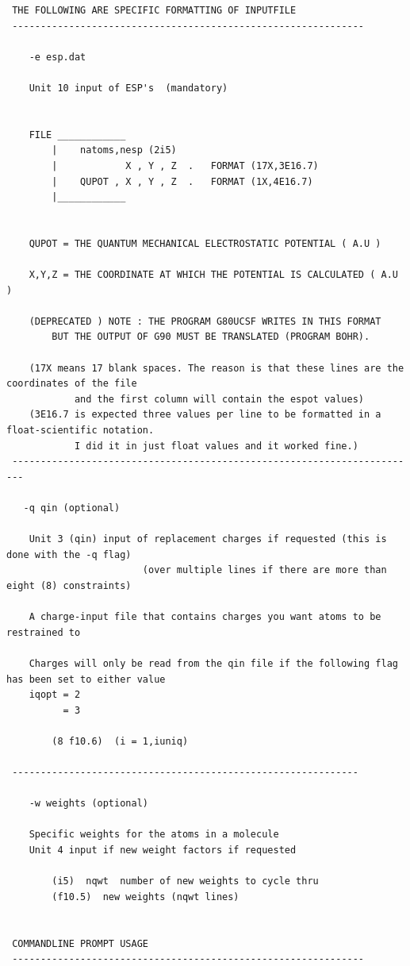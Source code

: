 \documentclass[a4paper]{article}
\begin{document}
\begin{tcolorbox}
\begin{verbatim}
 THE FOLLOWING ARE SPECIFIC FORMATTING OF INPUTFILE
 --------------------------------------------------------------

    -e esp.dat

    Unit 10 input of ESP's  (mandatory)
 

    FILE ____________
        |    natoms,nesp (2i5)
        |            X , Y , Z  .   FORMAT (17X,3E16.7)
        |    QUPOT , X , Y , Z  .   FORMAT (1X,4E16.7)
        |____________
 

    QUPOT = THE QUANTUM MECHANICAL ELECTROSTATIC POTENTIAL ( A.U )
 
    X,Y,Z = THE COORDINATE AT WHICH THE POTENTIAL IS CALCULATED ( A.U )
 
    (DEPRECATED ) NOTE : THE PROGRAM G80UCSF WRITES IN THIS FORMAT
        BUT THE OUTPUT OF G90 MUST BE TRANSLATED (PROGRAM BOHR).

    (17X means 17 blank spaces. The reason is that these lines are the coordinates of the file
            and the first column will contain the espot values)
    (3E16.7 is expected three values per line to be formatted in a float-scientific notation.
            I did it in just float values and it worked fine.)
 ------------------------------------------------------------------------
 
   -q qin (optional)

    Unit 3 (qin) input of replacement charges if requested (this is done with the -q flag)
                        (over multiple lines if there are more than eight (8) constraints)

    A charge-input file that contains charges you want atoms to be restrained to

    Charges will only be read from the qin file if the following flag has been set to either value
    iqopt = 2 
          = 3
 
        (8 f10.6)  (i = 1,iuniq)
 
 -------------------------------------------------------------

    -w weights (optional)

    Specific weights for the atoms in a molecule
    Unit 4 input if new weight factors if requested
 
        (i5)  nqwt  number of new weights to cycle thru
        (f10.5)  new weights (nqwt lines)
 

 COMMANDLINE PROMPT USAGE
 --------------------------------------------------------------
 

\end{verbatim}
\end{tcolorbox}
\end{document}
